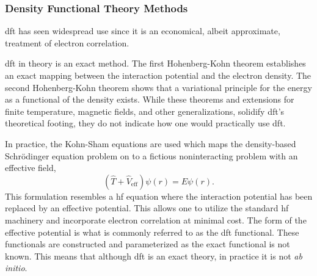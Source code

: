 \subsubsection{Density Functional Theory Methods}
\gls{dft} has seen widespread use since it is an economical, albeit approximate, treatment of electron correlation.\cite{10.1103/RevModPhys.87.897, 10.1002/qua.24259}

\gls{dft} in theory is an exact method.
The first Hohenberg-Kohn theorem establishes an exact mapping between the interaction potential and the electron density.\cite{10.1103/PhysRev.136.B864}
The second Hohenberg-Kohn theorem shows that a variational principle for the energy as a functional of the density exists.\cite{10.1103/PhysRev.136.B864}
While these theorems and extensions for finite temperature, magnetic fields, and other generalizations,\cite{10.1103/PhysRev.137.A1441, 10.1103/PhysRevLett.59.2360,10.1073/pnas.76.12.6062} solidify \gls{dft}'s theoretical footing, they do not indicate how one would practically use \gls{dft}.

In practice, the Kohn-Sham equations are used which maps the density-based Schr{\"o}dinger equation problem on to a fictious noninteracting problem with an effective field,
\begin{equation}
(\hat{T} + \hat{V}_{\mathrm{eff}}) \psi(r) = E \psi(r).
\end{equation}
This formulation resembles a \gls{hf} equation where the interaction potential has been replaced by an effective potential.
This allows one to utilize the standard \gls{hf} machinery and incorporate electron correlation at minimal cost.
The form of the effective potential is what is commonly referred to as the \gls{dft} functional.
These functionals are constructed and parameterized as the exact functional is not known.
This means that although \gls{dft} is an exact theory, in practice it is not \textit{ab initio}.


